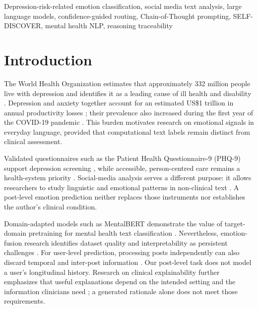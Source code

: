 \documentclass{ieeeaccess}
\begin{document}
\begin{keywords}
Depression-risk-related emotion classification, social media text analysis, large language models, confidence-guided routing, Chain-of-Thought prompting, SELF-DISCOVER, mental health NLP, reasoning traceability
\end{keywords}

\titlepgskip=-21pt
\maketitle

\section{Introduction}

The World Health Organization estimates that approximately 332 million people live with depression \cite{ref1} and identifies it as a leading cause of ill health and disability \cite{ref2}. Depression and anxiety together account for an estimated US\$1 trillion in annual productivity losses \cite{ref3}; their prevalence also increased during the first year of the COVID-19 pandemic \cite{ref4}. This burden motivates research on emotional signals in everyday language, provided that computational text labels remain distinct from clinical assessment.

Validated questionnaires such as the Patient Health Questionnaire-9 (PHQ-9) support depression screening \cite{ref5}, while accessible, person-centred care remains a health-system priority \cite{ref6}. Social-media analysis serves a different purpose: it allows researchers to study linguistic and emotional patterns in non-clinical text \cite{ref7}. A post-level emotion prediction neither replaces those instruments nor establishes the author's clinical condition.

Domain-adapted models such as MentalBERT demonstrate the value of target-domain pretraining for mental health text classification \cite{ref8}. Nevertheless, emotion-fusion research identifies dataset quality and interpretability as persistent challenges \cite{ref9}. For user-level prediction, processing posts independently can also discard temporal and inter-post information \cite{ref10}. Our post-level task does not model a user's longitudinal history. Research on clinical explainability further emphasizes that useful explanations depend on the intended setting and the information clinicians need \cite{ref11}; a generated rationale alone does not meet those requirements.
\end{document}
